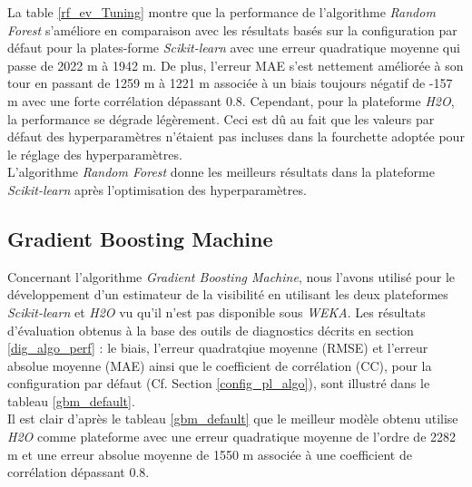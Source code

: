 La table \ref{rf_ev_Tuning} montre que la performance de l'algorithme \textit{Random Forest} s'améliore en comparaison avec les résultats basés sur la configuration par défaut pour la plates-forme \textit{Scikit-learn} avec une erreur quadratique moyenne qui passe de 2022 m à 1942 m. De plus, l'erreur MAE s'est nettement améliorée à son tour en passant de 1259 m à 1221 m associée à un biais toujours négatif de -157 m avec une forte corrélation dépassant 0.8. Cependant, pour la plateforme \textit{H2O}, la performance se dégrade légèrement. Ceci est dû au fait que les valeurs par défaut des hyperparamètres n'étaient pas incluses dans la fourchette adoptée pour le réglage des hyperparamètres.\\

 L'algorithme \textit{Random Forest} donne les meilleurs résultats dans la plateforme \textit{Scikit-learn} après l'optimisation des hyperparamètres.


\subsection*{Gradient Boosting Machine}
Concernant l'algorithme \textit{Gradient Boosting Machine}, nous l'avons utilisé pour le développement d'un estimateur de la visibilité en utilisant les deux plateformes \textit{Scikit-learn} et \textit{H2O} vu qu'il n'est pas disponible sous \textit{WEKA}. Les résultats d'évaluation obtenus à la base des outils de diagnostics décrits en section \ref{dig_algo_perf} : le biais, l'erreur quadratqiue moyenne (RMSE) et l'erreur absolue moyenne (MAE) ainsi que le coefficient de corrélation (CC), pour la configuration par défaut (Cf. Section \ref{config_pl_algo}), sont illustré dans le tableau \ref{gbm_default}.\\

Il est clair d'après le tableau \ref{gbm_default} que le meilleur modèle obtenu utilise \textit{H2O} comme plateforme avec une erreur quadratique moyenne de l'ordre de 2282 m et une erreur absolue moyenne de 1550 m associée à une coefficient de corrélation dépassant 0.8.  \\ 

